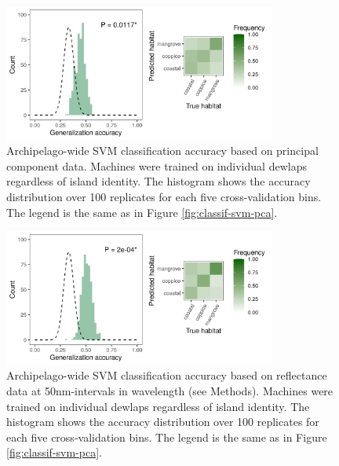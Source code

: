 \begin{figure}[H]
	\centering
	\includegraphics[width=0.8\textwidth]{"../analyses/04-machine learning/plots/classif_svm_pca_pooled"}
	\caption{Archipelago-wide SVM classification accuracy based on principal component data. Machines were trained on individual dewlaps regardless of island identity. The histogram shows the accuracy distribution over 100 replicates for each five cross-validation bins. The legend is the same as in Figure \ref{fig:classif-svm-pca}.}
	\label{supfig:classif-svm-pca-pooled}
\end{figure}

\begin{figure}[H]
	\centering
	\includegraphics[width=0.8\textwidth]{"../analyses/04-machine learning/plots/classif_svm_refl_pooled"}
	\caption{Archipelago-wide SVM classification accuracy based on reflectance data at 50nm-intervals in wavelength (see Methods). Machines were trained on individual dewlaps regardless of island identity. The histogram shows the accuracy distribution over 100 replicates for each five cross-validation bins. The legend is the same as in Figure \ref{fig:classif-svm-pca}.}
	\label{supfig:classif-svm-refl-pooled}
\end{figure}

